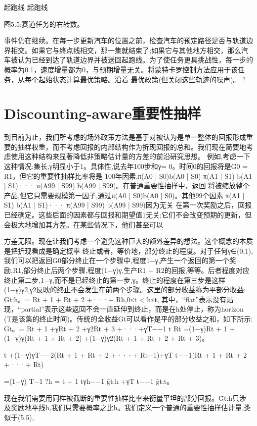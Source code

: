 起跑线 					起跑线


图5.5:赛道任务的右转数。


事件仍在继续。在每一步更新汽车的位置之前，检查汽车的预定路径是否与轨道边界相交。如果它与终点线相交，那一集就结束了;如果它与其他地方相交，那么汽车被认为已经到达了轨道边界并被送回起跑线。为了使任务更具挑战性，每一步的概率为0.1，速度增量都为0，与预期增量无关。将蒙特卡罗控制方法应用于该任务，从每个起始状态计算最优策略。沿着
最优政策(但关闭这些轨迹的噪声)。 					?


\section{Discounting-aware重要性抽样}

到目前为止，我们所考虑的场外政策方法是基于对被认为是单一整体的回报形成重要的抽样权重，而不考虑回报的内部结构作为折现回报的总和。我们现在简要地考虑使用这种结构来显著降低非策略估计量的方差的前沿研究思想。
例如,考虑一下这种情况:集长,γ明显小于1。具体性,说去年100步和γ= 0。时间0的回报将是G0 = R1，但它的重要性抽样比率将是
100年因素,π(A0 | S0)b(A0 | S0)
π(A1 | S1)
b(A1 | S1)···
π(A99 | S99)
b(A99 | S99)。在普通重要性抽样中，返回
将被缩放整个产品,但它只需要规模第一因子,通过π(A0 | S0)b(A0 | S0)。其他99个因素
π(A1 | S1)
b(A1 | S1)···
π(A99 | S99)
b(A99 | S99)因为无关
在第一次奖励之后，回报已经确定。这些后面的因素都与回报和期望值1无关;它们不会改变预期的更新，但会极大地增加其方差。在某些情况下，他们甚至可以

方差无限。现在让我们考虑一个避免这种巨大的额外差异的想法。这个概念的本质是把折现看成是确定概率
终止或者，等价地，部分终止的程度。对于任何γ∈(0,1),我们可以把返回G0部分终止在一个步骤中,程度1−γ,产生一个返回的第一个奖励,R1,部分终止后两个步骤,程度(1−γ)γ,生产R1 + R2的回报,等等。后者程度对应终止第二步,1−γ,而不是已经终止的第一步,γ。终止的程度在第三步是这样(1−γ)γ2,γ2反映的终止不会发生在前两个步骤。这里的部分收益称为平部分收益:
Ḡt:h。= Rt + 1 + Rt + 2 +···+ Rh,0≤t < h≤t,
其中，“flat”表示没有贴现，“partial”表示这些返回不会一直延伸到终止，而是在h处停止，称为horizon (T是该集的终止时间)。传统的全收益Gt可以看作是平的部分收益之和，如下所示:
Gt。= Rt + 1 +γRt + 2 +γ2Rt + 3 +···+γT−−1 t Rt
=(1−γ)Rt + 1
+(1−γ)γ(Rt + 1 + Rt + 2)
+(1−γ)γ2(Rt + 1 + Rt + 2 + Rt + 3)。


t +(1−γ)γT−−2(Rt + 1 + Rt + 2 +···+ Rt−1)+γT t−−1(Rt + 1 + Rt + 2 +···+ Rt)

=(1−γ)
T−1 ?h = t + 1
tγh−−1 ḡt:h +γT t−−1 ḡt:t。

现在我们需要用同样被截断的重要性抽样比率来衡量平坦的部分回报。Ḡt:h只涉及奖励地平线h,我们只需要概率之比h。我们定义一个普通的重要性抽样估计量,类似于(5.5),

